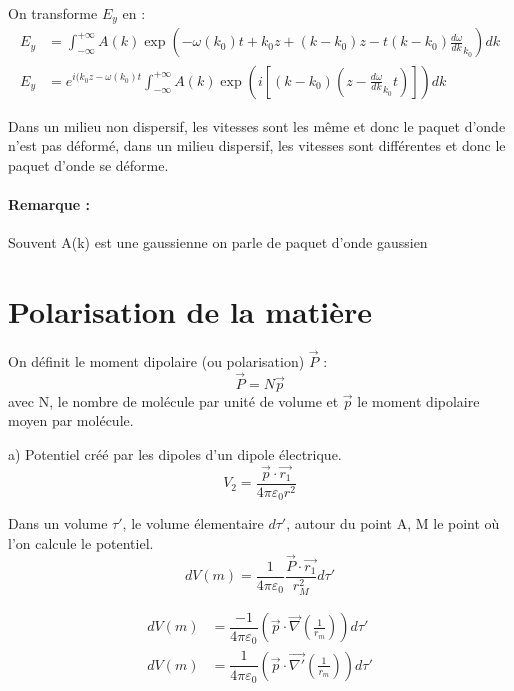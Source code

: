\documentclass[12pt,a4paper]{report}
\begin{document}
On transforme \(E_y\) en :
\begin{align*}
	E_y &= \int_{-\infty}^{+\infty} A(k) \exp(-\omega(k_0)t + k_0 z + (k - k_0)z - t(k - k_0)\frac{d\omega}{dk}_{k_0}) dk\\
	E_y &= e^{i(k_0 z - \omega(k_0)t} \int_{-\infty}^{+\infty} A(k) \exp \left(i \left[ (k - k_0)(z - \frac{d\omega}{dk}_{k_0}t) \right]\right) dk
\end{align*}

Dans un milieu non dispersif, les vitesses sont les même et donc le paquet d'onde n'est pas déformé, dans un milieu dispersif, les vitesses sont différentes et donc le paquet d'onde se déforme.

\paragraph{Remarque :} Souvent A(k) est une gaussienne on parle de paquet d'onde gaussien

\section{Polarisation de la matière}

On définit le moment dipolaire (ou polarisation) \(\vec{P}\) :
\[
	\vec{P} = N \vec{p}
\]
avec N, le nombre de molécule par unité de volume et \(\vec{p}\) le moment dipolaire moyen par molécule.

a) Potentiel créé par les dipoles d'un dipole électrique.
\[
	V_2 = \dfrac{\vec{p}\cdot \vec{r_1}}{4\pi \varepsilon_0 r^2}
\]

Dans un volume \(\tau'\), le volume élementaire \(d\tau'\), autour du point A, M le point où l'on calcule le potentiel.
\[
	dV(m) = \dfrac{1}{4\pi \varepsilon_0} \dfrac{\vec{P} \cdot \vec{r_1}}{r_M^2} d\tau'
\]

\begin{align*}
	dV(m) &= \dfrac{-1}{4\pi \varepsilon_0} \left( \vec{p} \cdot \vec{\nabla} (\frac{1}{r_m}) \right) d\tau'\\
	dV(m) &= \dfrac{1}{4\pi \varepsilon_0} \left( \vec{p} \cdot \vec{\nabla'} (\frac{1}{r_m}) \right) d\tau'
\end{align*}
\end{document}

